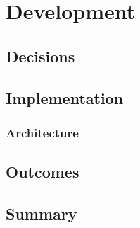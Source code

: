 \chapter{Development}
		
	\section{Decisions}
    \section{Implementation}
    \subsection{Architecture}
    \section{Outcomes}
	\section{Summary}